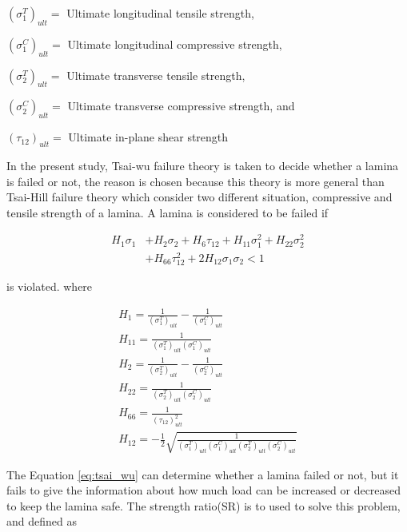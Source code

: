 \documentclass[Afour,sagev,times]{sagej}
\begin{document}
$(\sigma_1^T)_{ult}=$ Ultimate longitudinal tensile strength,

$(\sigma_1^C)_{ult}=$ Ultimate longitudinal compressive strength,

$(\sigma_2^T)_{ult}=$ Ultimate transverse tensile strength,

$(\sigma_2^C)_{ult}=$ Ultimate transverse compressive strength, and

$(\tau_{12})_{ult}=$ Ultimate in-plane shear strength

In the present study, Tsai-wu failure theory is taken to decide whether a lamina is failed or not, the
reason is chosen because this theory is  more general than Tsai-Hill failure theory which consider
two different situation, compressive and tensile strength of a lamina. A lamina is considered to be
failed if


\begin{equation} \label{eq:tsai_wu}
\begin{split}
	H_1 \sigma_1 & + H_2 \sigma_2 + H_6 \tau_{12} + H_{11}\sigma_1^2 + H_{22} \sigma_2^2 \\
                 & + H_{66}  \tau_{12}^2 + 2H_{12}\sigma_1\sigma_2 < 1
\end{split}
\end{equation}
 
is violated. where


\begin{equation}
	\begin{array}{l}
		H_{1}=\frac{1}{\left(\sigma_{1}^{T}\right)_{u l t}}-\frac{1}{\left(\sigma_{1}^{C}\right)_{u l
	t}} \\
	H_{11}=\frac{1}{\left(\sigma_{1}^{T}\right)_{u l t}\left(\sigma_{1}^{C}\right)_{u l t}} \\
	H_{2}=\frac{1}{\left(\sigma_{2}^{T}\right)_{u l t}}-\frac{1}{\left(\sigma_{2}^{C}\right)_{u l
	t}} \\
	H_{22}=\frac{1}{\left(\sigma_{2}^{T}\right)_{u l t}\left(\sigma_{2}^{C}\right)_{u l t}} \\
	H_{66}=\frac{1}{\left(\tau_{12}\right)_{u l t}^{2}} \\
	H_{12}=-\frac{1}{2} \sqrt{\frac{1}{\left(\sigma_{1}^{T}\right)_{u l
				t}\left(\sigma_{1}^{C}\right)_{u l t}\left(\sigma_{2}^{T}\right)_{u l
	t}\left(\sigma_{2}^{C}\right)_{u l t}}}
	\end{array}
\end{equation}


The Equation \ref{eq:tsai_wu} can determine whether a lamina failed or not, but it fails to give the
information about how much load can be increased or decreased to keep the lamina safe. The strength
ratio(SR) is to used to solve this problem, and defined as
\end{document}
